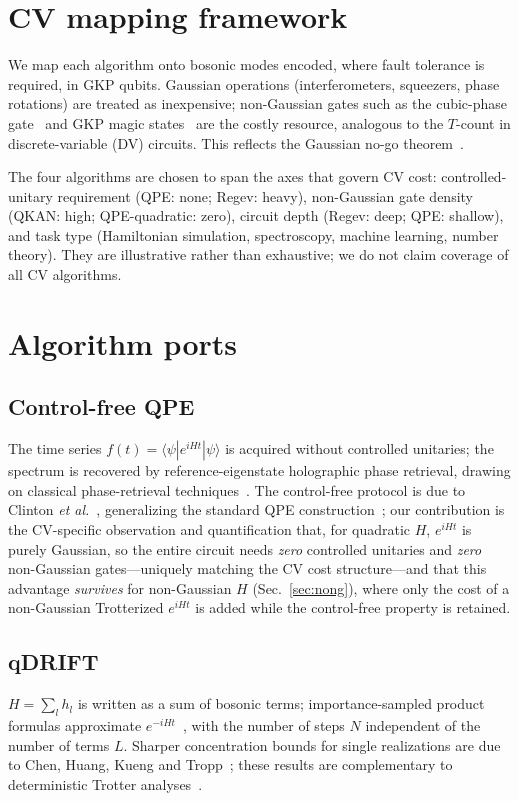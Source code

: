 \documentclass[aps,pra,reprint,superscriptaddress,nofootinbib]{revtex4-2}
\begin{document}
\section{CV mapping framework}
We map each algorithm onto bosonic modes encoded, where fault tolerance is
required, in GKP qubits. Gaussian operations (interferometers, squeezers,
phase rotations) are treated as inexpensive; non-Gaussian gates such as the
cubic-phase gate~\cite{Marek2011,GKP2001} and GKP magic
states~\cite{Eaton2019,Konno2024} are the costly resource, analogous to the
$T$-count in discrete-variable (DV) circuits. This reflects the Gaussian
no-go theorem~\cite{Niset2009,Eisert2002}.

The four algorithms are chosen to span the axes that govern CV cost:
controlled-unitary requirement (QPE: none; Regev: heavy), non-Gaussian gate
density (QKAN: high; QPE-quadratic: zero), circuit depth (Regev: deep; QPE:
shallow), and task type (Hamiltonian simulation, spectroscopy, machine
learning, number theory). They are illustrative rather than exhaustive; we do
not claim coverage of all CV algorithms.

\section{Algorithm ports}
\subsection{Control-free QPE}
The time series $f(t)=\langle\psi|e^{iHt}|\psi\rangle$ is acquired without
controlled unitaries; the spectrum is recovered by reference-eigenstate
holographic phase retrieval, drawing on classical phase-retrieval
techniques~\cite{Fienup1982}. The control-free protocol is due to Clinton
\emph{et al.}~\cite{Clinton2026}, generalizing the standard QPE
construction~\cite{Kitaev1995}; our contribution is the CV-specific
observation and
quantification that, for quadratic $H$, $e^{iHt}$ is purely Gaussian, so the
entire circuit needs \emph{zero} controlled unitaries and \emph{zero}
non-Gaussian gates---uniquely matching the CV cost structure---and that this
advantage \emph{survives} for non-Gaussian $H$ (Sec.~\ref{sec:nong}), where
only the cost of a non-Gaussian Trotterized $e^{iHt}$ is added while the
control-free property is retained.

\subsection{qDRIFT}
$H=\sum_l h_l$ is written as a sum of bosonic terms; importance-sampled
product formulas approximate $e^{-iHt}$~\cite{Campbell2019}, with the
number of steps $N$ independent of the number of terms $L$. Sharper
concentration bounds for single realizations are due to Chen, Huang, Kueng
and Tropp~\cite{Chen2021}; these results are complementary to deterministic
Trotter analyses~\cite{Berry2015,Childs2021}.
\end{document}
